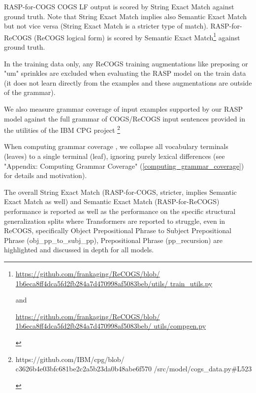 \documentclass[11pt]{article}
\begin{document}
RASP-for-COGS COGS LF output is scored by String Exact Match against ground truth. Note that String Exact Match implies also Semantic Exact Match but not vice versa (String Exact Match is a stricter type of match).
RASP-for-ReCOGS (ReCOGS logical form) is scored by Semantic Exact Match\footnote{ 
\begin{footnotesize}\href{https://github.com/frankaging/ReCOGS/blob/1b6eca8ff4dca5fd2fb284a7d470998af5083beb/utils/train_utils.py}{https://github.com/frankaging/ReCOGS/blob/
1b6eca8ff4dca5fd2fb284a7d470998af5083beb/utils/
train\_utils.py}

and

\href{https://github.com/frankaging/ReCOGS/blob/1b6eca8ff4dca5fd2fb284a7d470998af5083beb/utils/compgen.py}{https://github.com/frankaging/ReCOGS/blob/
1b6eca8ff4dca5fd2fb284a7d470998af5083beb/
utils/compgen.py}
\end{footnotesize}
} against ground truth.

In the training data only, any ReCOGS training augmentations like preposing or "um" sprinkles are excluded when evaluating the RASP model on the train data (it does not learn directly from the examples and these augmentations are outside of the grammar). 

We also measure grammar coverage of input examples supported by our RASP model against the full grammar of COGS/ReCOGS input sentences provided in the utilities of the IBM CPG project \cite{klinger2024compositionalprogramgenerationfewshot}\footnote{\begin{footnotesize}https://github.com/IBM/cpg/blob/
c3626b4e03bfc681be2c2a5b23da0b48abe6f570
/src/model/cogs\_data.py\#L523\end{footnotesize}
}

When computing grammar coverage \cite{fuzzingbook2023:GrammarCoverageFuzzer}, we collapse all vocabulary terminals (leaves) to a single terminal (leaf), ignoring purely lexical differences (see "Appendix: Computing Grammar Coverage" (\ref{computing_grammar_coverage}) for details and motivation).

The overall String Exact Match (RASP-for-COGS, stricter, implies Semantic Exact Match as well) and Semantic Exact Match (RASP-for-ReCOGS) performance is reported as well as the performance on the specific structural generalization splits where Transformers are reported to struggle, even in ReCOGS, specifically Object Prepositional Phrase to Subject Prepositional Phrase (obj\_pp\_to\_subj\_pp),
Prepositional Phrase (pp\_recursion) are highlighted and discussed in depth for all models.
\end{document}
